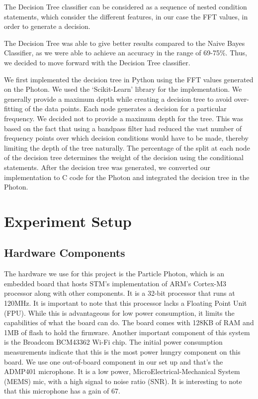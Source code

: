 \documentclass[sigconf, authorversion=false,  screen=true]{acmart}
\begin{document}
	The Decision Tree classifier can be considered as a sequence of nested condition statements, which consider the different features, in our case the FFT values, in order to  generate a decision.
	
	The Decision Tree was able to give better results compared to the Naive Bayes Classifier, as we were able to achieve an accuracy in the range of 69-75\%. Thus, we decided to move forward with the Decision Tree classifier.
	
	We first implemented the decision tree in Python using the FFT values generated on the Photon. We used the ‘Scikit-Learn’\cite{sklearn_api} library for the implementation. We generally provide a maximum depth while creating a decision tree to avoid over-fitting of the data points. Each node generates a decision for a particular frequency. We decided not to provide a maximum depth for the tree. This was based on the fact that using a bandpass filter had reduced the vast number of frequency points over which decision conditions would have to be made, thereby limiting the depth of the tree naturally.
	The percentage of the split at each node of the decision tree determines the weight of the decision using the conditional statements. After the decision tree was generated, we converted our implementation to C code for the Photon and integrated the decision tree in the Photon.
	
\section{Experiment Setup}
	
	\subsection{Hardware  Components}
	The hardware we use for this project is the Particle Photon, which is an embedded board that hosts STM's implementation of ARM's Cortex-M3 processor along with other components. It is a 32-bit processor that runs at 120MHz. It is important to note that this processor lacks a Floating Point Unit (FPU). While this is advantageous for low power consumption, it limits the capabilities of what the board can do. The board comes with 128KB of RAM and 1MB of flash to hold the firmware. Another important component of this system is the Broadcom BCM43362 Wi-Fi chip. The initial power consumption measurements indicate that this is the most power hungry component on this board. We use one out-of-board component in our set up and that's the ADMP401 microphone. It is a low power, MicroElectrical-Mechanical System (MEMS) mic, with a high signal to noise ratio (SNR). It is interesting to note that this microphone has a gain of 67.
\end{document}
